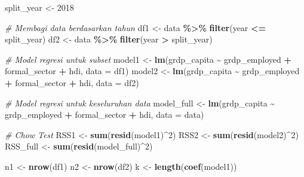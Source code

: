 \documentclass[
]{article}
\newenvironment{Shaded}{\begin{snugshade}}{\end{snugshade}}
\newcommand{\AttributeTok}[1]{\textcolor[rgb]{0.13,0.29,0.53}{#1}}
\newcommand{\CommentTok}[1]{\textcolor[rgb]{0.56,0.35,0.01}{\textit{#1}}}
\newcommand{\DecValTok}[1]{\textcolor[rgb]{0.00,0.00,0.81}{#1}}
\newcommand{\FunctionTok}[1]{\textcolor[rgb]{0.13,0.29,0.53}{\textbf{#1}}}
\newcommand{\NormalTok}[1]{#1}
\newcommand{\OtherTok}[1]{\textcolor[rgb]{0.56,0.35,0.01}{#1}}
\newcommand{\SpecialCharTok}[1]{\textcolor[rgb]{0.81,0.36,0.00}{\textbf{#1}}}
\begin{document}
\begin{Shaded}
\begin{Highlighting}[]
\NormalTok{split\_year }\OtherTok{\textless{}{-}} \DecValTok{2018}

\CommentTok{\# Membagi data berdasarkan tahun}
\NormalTok{df1 }\OtherTok{\textless{}{-}}\NormalTok{ data }\SpecialCharTok{\%\textgreater{}\%} \FunctionTok{filter}\NormalTok{(year }\SpecialCharTok{\textless{}=}\NormalTok{ split\_year)}
\NormalTok{df2 }\OtherTok{\textless{}{-}}\NormalTok{ data }\SpecialCharTok{\%\textgreater{}\%} \FunctionTok{filter}\NormalTok{(year }\SpecialCharTok{\textgreater{}}\NormalTok{ split\_year)}

\CommentTok{\# Model regresi untuk subset}
\NormalTok{model1 }\OtherTok{\textless{}{-}} \FunctionTok{lm}\NormalTok{(grdp\_capita }\SpecialCharTok{\textasciitilde{}}\NormalTok{ grdp\_employed }\SpecialCharTok{+}\NormalTok{ formal\_sector }\SpecialCharTok{+}\NormalTok{ hdi, }\AttributeTok{data =}\NormalTok{ df1)}
\NormalTok{model2 }\OtherTok{\textless{}{-}} \FunctionTok{lm}\NormalTok{(grdp\_capita }\SpecialCharTok{\textasciitilde{}}\NormalTok{ grdp\_employed }\SpecialCharTok{+}\NormalTok{ formal\_sector }\SpecialCharTok{+}\NormalTok{ hdi, }\AttributeTok{data =}\NormalTok{ df2)}

\CommentTok{\# Model regresi untuk keseluruhan data}
\NormalTok{model\_full }\OtherTok{\textless{}{-}} \FunctionTok{lm}\NormalTok{(grdp\_capita }\SpecialCharTok{\textasciitilde{}}\NormalTok{ grdp\_employed }\SpecialCharTok{+}\NormalTok{ formal\_sector }\SpecialCharTok{+}\NormalTok{ hdi, }\AttributeTok{data =}\NormalTok{ data)}

\CommentTok{\# Chow Test}
\NormalTok{RSS1 }\OtherTok{\textless{}{-}} \FunctionTok{sum}\NormalTok{(}\FunctionTok{resid}\NormalTok{(model1)}\SpecialCharTok{\^{}}\DecValTok{2}\NormalTok{)}
\NormalTok{RSS2 }\OtherTok{\textless{}{-}} \FunctionTok{sum}\NormalTok{(}\FunctionTok{resid}\NormalTok{(model2)}\SpecialCharTok{\^{}}\DecValTok{2}\NormalTok{)}
\NormalTok{RSS\_full }\OtherTok{\textless{}{-}} \FunctionTok{sum}\NormalTok{(}\FunctionTok{resid}\NormalTok{(model\_full)}\SpecialCharTok{\^{}}\DecValTok{2}\NormalTok{)}

\NormalTok{n1 }\OtherTok{\textless{}{-}} \FunctionTok{nrow}\NormalTok{(df1)}
\NormalTok{n2 }\OtherTok{\textless{}{-}} \FunctionTok{nrow}\NormalTok{(df2)}
\NormalTok{k }\OtherTok{\textless{}{-}} \FunctionTok{length}\NormalTok{(}\FunctionTok{coef}\NormalTok{(model1))}


\end{Highlighting}
\end{Shaded}
\end{document}
